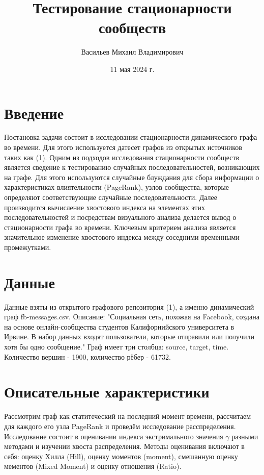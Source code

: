 \documentclass[a4paper,12pt]{article}
\begin{document}
\title{Тестирование стационарности сообществ}



\author{Васильев Михаил Владимирович}


\date{11 мая 2024 г.}%
             



\maketitle

\section{Введение}
Постановка задачи состоит в исследовании стационарности динамического графа во времени. Для этого используется датесет графов из открытых источников таких как (1). Одним из подходов исследования стационарности сообществ является сведение к тестированию случайных последовательностей, возникающих на графе. Для этого используются случайные блуждания для сбора информации о характеристиках влиятельности (PageRank), узлов сообщества, которые определяют соответствующие случайные последовательности. Далее производится вычисление хвостового индекса на элементах этих последовательностей и посредствам визуального анализа делается вывод о стационарности графа во времени. Ключевым критерием анализа является значительное изменение хвостового индекса между соседними временными промежутками.



\section{Данные}
Данные взяты из открытого графового репозитория (1), а именно динамический граф fb-messages.csv. Описание: "Социальная сеть, похожая на Facebook, создана на основе онлайн-сообщества студентов Калифорнийского университета в Ирвине. В набор данных входят пользователи, которые отправили или получили хотя бы одно сообщение." Граф имеет три столбца: source, target, time. Количество вершин - 1900, количество рёбер - 61732.


\section{Описательные характеристики}
Рассмотрим граф как статитеческий на последний момент времени, рассчитаем для каждого его узла PageRank и проведём исследование расспределения. Исследование состоит в оценивании индекса экстримального значения $\gamma$ разными методами и изучении хвоста распределения. Методы оценивания включают в себя: оценку Хилла (Hill), оценку моментов (moment),  смешанную оценку мементов (Mixed Moment) и оценку отношения (Ratio).
\end{document}

